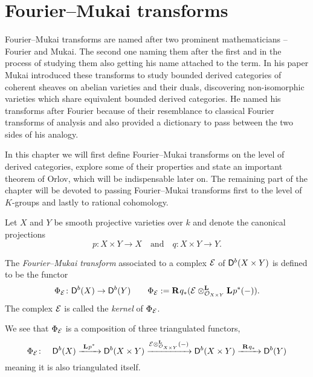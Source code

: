 \section{Fourier--Mukai transforms}
\label{Chapter: Fourier-Mukai transforms}

Fourier--Mukai transforms are named after two prominent mathematicians -- Fourier and Mukai. The second one naming them after the first and in the process of studying them also getting his name attached to the term. In his paper \cite{Mukai1981} Mukai introduced these transforms to study bounded derived categories of coherent sheaves on abelian varieties and their duals, discovering non-isomorphic varieties which share equivalent bounded derived categories. He named his transforms after Fourier because of their resemblance to classical Fourier transforms of analysis and also provided a dictionary to pass between the two sides of his analogy.

In this chapter we will first define Fourier--Mukai transforms on the level of derived categories, explore some of their properties and state an important theorem of Orlov, which will be indispensable later on. The remaining part of the chapter will be devoted to passing Fourier--Mukai transforms first to the level of $K$-groups and lastly to rational cohomology.   

\vspace{0.3cm}
\noindent
Let $X$ and $Y$ be smooth projective varieties over $k$ and denote the canonical projections 
\[
    p \colon X \times Y \to X \quad \text{and} \quad q \colon X \times Y \to Y.
\]

\begin{definition}
    The \emph{Fourier--Mukai transform} associated to a complex $\E$ of $\derb{X \times Y}$ is defined to be the functor
    \[
        \fm{\E} \colon \derb{X} \to \derb{Y} \qquad \fm{\E} := \rderived{}{q_*}(\derivedtensor{\E}{\lderived{}{p^*}(-)}{\struct{X \times Y}}).
    \]
    The complex $\E$ is called the \emph{kernel} of $\fm{\E}$.
\end{definition}

\begin{remark}
    We see that $\fm{\E}$ is a composition of three triangulated functors,
    \[
        \fm{\E} \colon \quad \derb{X} \xrightarrow{\ \lderived{}{p^*} \ } \derb{X \times Y} \xrightarrow{\derivedtensor{\E}{(-)}{\struct{X \times Y}}} \derb{X \times Y} \xrightarrow{\ \rderived{}{q_*} \ } \derb{Y}
    \]
    meaning it is also triangulated itself.  
\end{remark}

